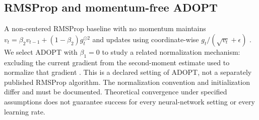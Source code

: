\subsection{RMSProp and momentum-free ADOPT}\label{sec:method-m3}

A non-centered RMSProp baseline with no momentum maintains
$v_t=\beta_2v_{t-1}+(1-\beta_2)g_t^{\odot2}$ and updates using coordinate-wise
$g_t/(\sqrt{v_t}+\epsilon)$ \citep{hintonrmsprop}. We select ADOPT with
$\beta_1=0$ to study a related normalization mechanism: excluding the current gradient
from the second-moment estimate used to normalize that gradient \citep{taniguchi2024adopt}.
This is a declared setting of ADOPT, not a separately published RMSProp algorithm.
The normalization convention and initialization differ and must be documented. Theoretical
convergence under specified assumptions does not guarantee success for every neural-network
setting or every learning rate.

